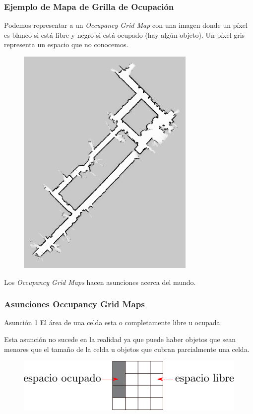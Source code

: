 \begin{frame}
    \frametitle{Ejemplo de Mapa de Grilla de Ocupación}
    
    Podemos representar a un \emph{Occupancy Grid Map} con una imagen donde un píxel es blanco si está libre y negro si está ocupado (hay algún objeto). Un píxel gris representa un espacio que no conocemos.
    
  	\begin{figure}[!h]
    		\includegraphics[width=0.23\columnwidth]{./images/volumetric_map_2d.png}
    \end{figure}


	Los \emph{Occupancy Grid Maps} hacen asunciones acerca del mundo.
       
\end{frame}

\begin{frame}
    \frametitle{Asunciones Occupancy Grid Maps}
    
    \begin{block}{Asunción 1}
	    El área de una celda esta o completamente libre u ocupada.
    \end{block}

	Esta asunción no sucede en la realidad ya que puede haber objetos que sean menores que el tamaño de la celda u objetos que cubran parcialmente una celda.
	
  	\begin{figure}[!h]
		\includegraphics[width=0.7\columnwidth]{./images/grid_map.pdf}
	\end{figure}
	
\end{frame}

